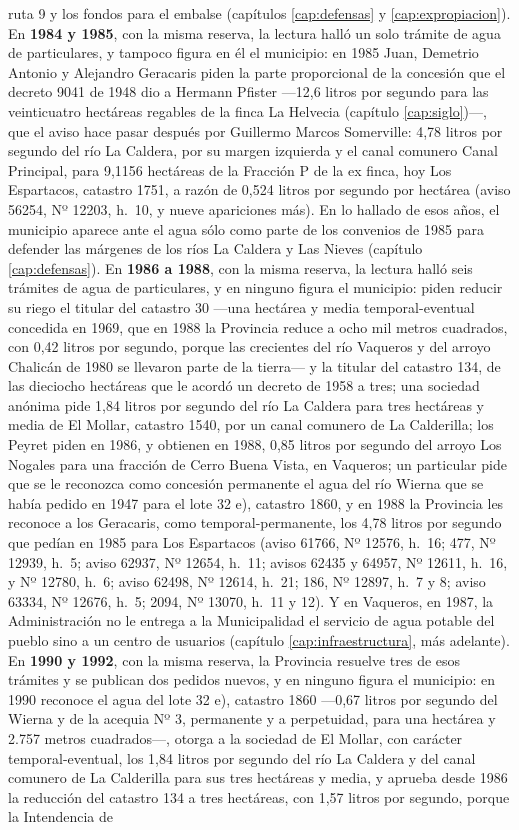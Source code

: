 {ruta 9 y los fondos para el embalse (capítulos \ref{cap:defensas} y \ref{cap:expropiacion}). En \textbf{1984 y 1985}, con la misma reserva, la lectura halló un solo trámite de agua de particulares, y tampoco figura en él el municipio: en 1985 Juan, Demetrio Antonio y Alejandro Geracaris piden la parte proporcional de la concesión que el decreto 9041 de 1948 dio a Hermann Pfister ---12,6 litros por segundo para las veinticuatro hectáreas regables de la finca La Helvecia (capítulo \ref{cap:siglo})---, que el aviso hace pasar después por Guillermo Marcos Somerville: 4,78 litros por segundo del río La Caldera, por su margen izquierda y el canal comunero Canal Principal, para 9,1156 hectáreas de la Fracción P de la ex finca, hoy Los Espartacos, catastro 1751, a razón de 0,524 litros por segundo por hectárea (aviso 56254, Nº 12203, h.\ 10, y nueve apariciones más). En lo hallado de esos años, el municipio aparece ante el agua sólo como parte de los convenios de 1985 para defender las márgenes de los ríos La Caldera y Las Nieves (capítulo \ref{cap:defensas}). En \textbf{1986 a 1988}, con la misma reserva, la lectura halló seis trámites de agua de particulares, y en ninguno figura el municipio: piden reducir su riego el titular del catastro 30 ---una hectárea y media temporal-eventual concedida en 1969, que en 1988 la Provincia reduce a ocho mil metros cuadrados, con 0,42 litros por segundo, porque las crecientes del río Vaqueros y del arroyo Chalicán de 1980 se llevaron parte de la tierra--- y la titular del catastro 134, de las dieciocho hectáreas que le acordó un decreto de 1958 a tres; una sociedad anónima pide 1,84 litros por segundo del río La Caldera para tres hectáreas y media de El Mollar, catastro 1540, por un canal comunero de La Calderilla; los Peyret piden en 1986, y obtienen en 1988, 0,85 litros por segundo del arroyo Los Nogales para una fracción de Cerro Buena Vista, en Vaqueros; un particular pide que se le reconozca como concesión permanente el agua del río Wierna que se había pedido en 1947 para el lote 32 e), catastro 1860, y en 1988 la Provincia les reconoce a los Geracaris, como temporal-permanente, los 4,78 litros por segundo que pedían en 1985 para Los Espartacos (aviso 61766, Nº 12576, h.\ 16; 477, Nº 12939, h.\ 5; aviso 62937, Nº 12654, h.\ 11; avisos 62435 y 64957, Nº 12611, h.\ 16, y Nº 12780, h.\ 6; aviso 62498, Nº 12614, h.\ 21; 186, Nº 12897, h.\ 7 y 8; aviso 63334, Nº 12676, h.\ 5; 2094, Nº 13070, h.\ 11 y 12). Y en Vaqueros, en 1987, la Administración no le entrega a la Municipalidad el servicio de agua potable del pueblo sino a un centro de usuarios (capítulo \ref{cap:infraestructura}, más adelante). En \textbf{1990 y 1992}, con la misma reserva, la Provincia resuelve tres de esos trámites y se publican dos pedidos nuevos, y en ninguno figura el municipio: en 1990 reconoce el agua del lote 32 e), catastro 1860 ---0,67 litros por segundo del Wierna y de la acequia Nº 3, permanente y a perpetuidad, para una hectárea y 2.757 metros cuadrados---, otorga a la sociedad de El Mollar, con carácter temporal-eventual, los 1,84 litros por segundo del río La Caldera y del canal comunero de La Calderilla para sus tres hectáreas y media, y aprueba desde 1986 la reducción del catastro 134 a tres hectáreas, con 1,57 litros por segundo, porque la Intendencia de }
